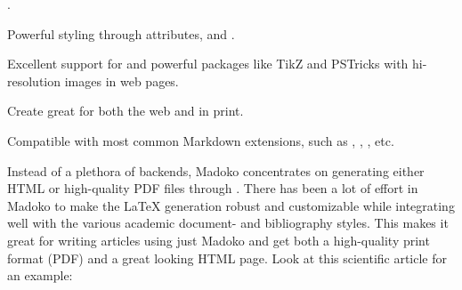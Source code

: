 \documentclass{book}
\begin{document}
\begin{mdUl}[class={list-star,compact},data-line={98}]
\begin{mdLi}[data-line={105}]
{}.%
\end{mdLi}%
\begin{mdLi}[data-line={106}]%
{}Powerful styling through attributes,%
{}{\mdNbsp}%
{} and 
{}{\mdNbsp}%
{}.%
\end{mdLi}%
\begin{mdLi}[data-line={108}]%
{}Excellent support for%
{}{\mdNbsp}%
{} and powerful packages like
  TikZ and PSTricks with hi-resolution images in web pages.%
\end{mdLi}%
\begin{mdLi}[data-line={110}]%
{}Create great%
{}{\mdNbsp}%
{} for both the web and in print.%
\end{mdLi}%
\begin{mdLi}[data-line={111}]%
{}Compatible with most common Markdown extensions, such as%
{}{\mdNbsp}%
{}, 
{}{\mdNbsp}%
{},%
{}{\mdNbsp}%
{}, etc.%
\end{mdLi}%
\end{mdUl}%
\begin{mdP}[data-line={114}]%
{}Instead of a plethora of backends, Madoko concentrates on generating either
HTML or high-quality PDF files through%
{}{\mdNbsp}%
{}. There has been a lot of effort
in Madoko to make the LaTeX generation robust and customizable while
integrating well with the various academic document- and bibliography styles.
This makes it great for writing articles using just Madoko and get both a
high-quality print format (PDF) and a great looking HTML page. Look at this
scientific article for an example:%
\end{mdP}%
\end{document}
